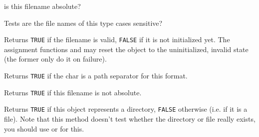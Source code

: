 

\label{wxfilenamehasvolume}



\label{wxfilenameinsertdir}



\label{wxfilenameisabsolute}


is this filename absolute?


\label{wxfilenameiscasesensitive}


Tests
are the file names of this type cases sensitive?


\label{wxfilenameisok}


Returns {\tt TRUE} if the filename is valid, {\tt FALSE} if it is not
initialized yet. The assignment functions and
 may reset the object to the uninitialized,
invalid state (the former only do it on failure).

\label{wxfilenameispathseparator}


Returns {\tt TRUE} if the char is a path separator for this format.

\label{wxfilenameisrelative}


Returns {\tt TRUE} if this filename is not absolute.

\label{wxfilenameisdir}


Returns {\tt TRUE} if this object represents a directory, {\tt FALSE} otherwise
(i.e. if it is a file). Note that this method doesn't test whether the
directory or file really exists, you should use 
 or 
 for this.

